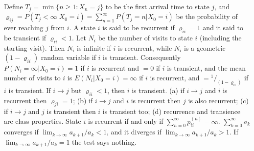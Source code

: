  Define $T_j = \min\{n \ge 1 : X_n = j\}$ to be the first arrival time to state $j$, and $\varrho_{ij} = P(T_j < \infty|X_0 = i) = \sum^\infty_{n=1}P(T_j = n| X_0 = i)$ be the probability of ever reaching $j$ from $i$.
 A state $i$ is said to be recurrent if $\varrho_{ii} = 1$ and it said to be transient if $\varrho_{ii} < 1$.
 Let $N_i$ be the number of visits to state $i$ (including the starting visit). Then $N_i$ is infinite if $i$ is recurrent, while $N_i$ is a geometric $(1- \varrho_{ii})$ random variable if $i$ is transient. Consequently $P(N_i = \infty|X_0 = i) = 1$ if $i$ is recurrent and $= 0$ if $i$ is transient, and the mean number of visits to $i$ is $E(N_i|X_0 = i) = \infty$ if $i$ is recurrent, and $=\!^1/_{(1-\varrho_{ii})}$ if $i$ is transient.
 If $i \to j$ but $\varrho_{ii} < 1$, then $i$ is transient.
 (a) if $i \to j$ and $i$ is recurrent then $\varrho_{ji} = 1$; 
(b) if $i \to j$ and $i$ is recurrent then $j$ is also recurrent; 
(c) if $i \to j$ and $j$ is transient then $i$ is transient too; 
(d) recurrence and transience are class properties.
 State $i$ is recurrent if and only if $\sum^{\infty}_{n=0} p^{(n)}_{ii} = \infty$.
 $\sum^{\infty}_{k=0} a_k$ converges if $\lim_{k\to \infty} a_{k+1}/a_k < 1$, and it diverges if $\lim_{k\to \infty} a_{k+1}/a_k > 1$. If $\lim_{k\to \infty} a_{k+1}/a_k = 1$ the test says nothing.
